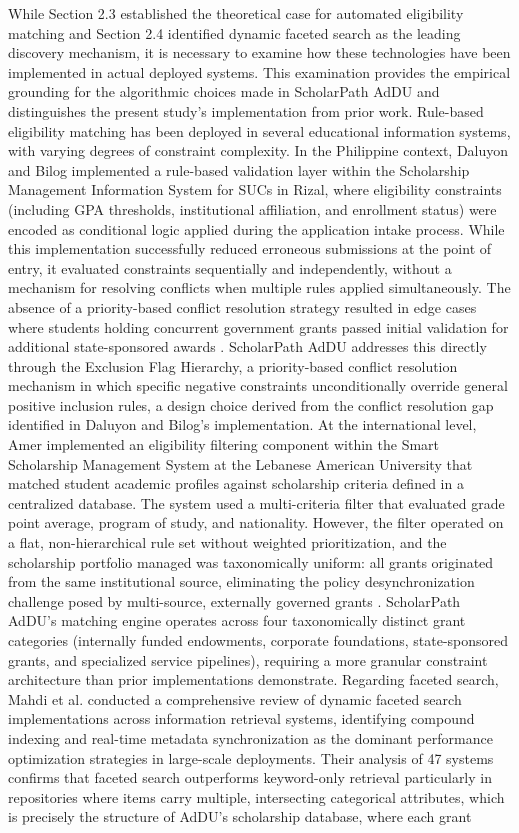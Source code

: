 While Section 2.3 established the theoretical case for automated eligibility matching and Section 2.4 identified dynamic faceted search as the leading discovery mechanism, it is necessary to examine how these technologies have been implemented in actual deployed systems. This examination provides the empirical grounding for the algorithmic choices made in ScholarPath AdDU and distinguishes the present study's implementation from prior work. Rule-based eligibility matching has been deployed in several educational information systems, with varying degrees of constraint complexity. In the Philippine context, Daluyon and Bilog \cite{ref14} implemented a rule-based validation layer within the Scholarship Management Information System for SUCs in Rizal, where eligibility constraints (including GPA thresholds, institutional affiliation, and enrollment status) were encoded as conditional logic applied during the application intake process. While this implementation successfully reduced erroneous submissions at the point of entry, it evaluated constraints sequentially and independently, without a mechanism for resolving conflicts when multiple rules applied simultaneously. The absence of a priority-based conflict resolution strategy resulted in edge cases where students holding concurrent government grants passed initial validation for additional state-sponsored awards \cite{ref14}. ScholarPath AdDU addresses this directly through the Exclusion Flag Hierarchy, a priority-based conflict resolution mechanism in which specific negative constraints unconditionally override general positive inclusion rules, a design choice derived from the conflict resolution gap identified in Daluyon and Bilog's implementation. At the international level, Amer \cite{ref5} implemented an eligibility filtering component within the Smart Scholarship Management System at the Lebanese American University that matched student academic profiles against scholarship criteria defined in a centralized database. The system used a multi-criteria filter that evaluated grade point average, program of study, and nationality. However, the filter operated on a flat, non-hierarchical rule set without weighted prioritization, and the scholarship portfolio managed was taxonomically uniform: all grants originated from the same institutional source, eliminating the policy desynchronization challenge posed by multi-source, externally governed grants \cite{ref5}. ScholarPath AdDU's matching engine operates across four taxonomically distinct grant categories (internally funded endowments, corporate foundations, state-sponsored grants, and specialized service pipelines), requiring a more granular constraint architecture than prior implementations demonstrate. Regarding faceted search, Mahdi et al. \cite{ref4} conducted a comprehensive review of dynamic faceted search implementations across information retrieval systems, identifying compound indexing and real-time metadata synchronization as the dominant performance optimization strategies in large-scale deployments. Their analysis of 47 systems confirms that faceted search outperforms keyword-only retrieval particularly in repositories where items carry multiple, intersecting categorical attributes, which is precisely the structure of AdDU's scholarship database, where each grant 